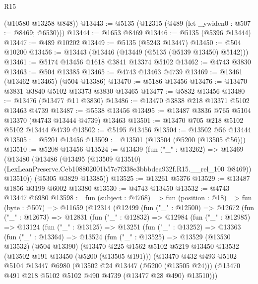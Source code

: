 \begin{lexlean}{R15}
\begin{coremodule}
{{{{{{{{{{{      (@10580 @13258 @848))
@13443 := @5135 (@12315 (@489 (let _ywiden0 : @507 := @8469; @6530)))
@13444 := @1653 @8469
@13446 := @5135 (@5396 @13444)
@13447 := @489 @10202
@13449 := @5135 (@5243 @13447)
@13450 := @504 @10200
@13456 := @13443 (@13446 (@13449 (@5135 (@5139 @13450) @5142)))
@13461 := @5174 @13456 @1618 @3841 @13374 @5102
@13462 := @4743 @3830
@13463 := @504 @13385
@13465 := @4743 @13463 @4739
@13469 := @13461 (@13462 @13465) (@504 @13386)
@13470 := @5186 @13456
@13476 := @13470 @3831 @3840 @5102 @13373 @3830 @13465
@13477 := @5832 @13456
@13480 := @13476 (@13477 @11 @3830)
@13486 := @13470 @3838 @218 @13371 @5102 @13463 @4739
@13487 := @5538 @13456
@13495 := @13487 @3836 @765 @5104 @13370 (@4743 @13444 @4739) @13463
@13501 := @13470 @705 @218 @5102 @5102 @13444 @4739
@13502 := @5195 @13456
@13504 := @13502 @56 @13444
@13505 := @5201 @13456
@13509 := @13501 (@13504 (@5200 (@13505 @56)))
@13510 := @5208 @13456
@13524 := @13439
    (fun ("_" : @13262) =>
    @13469
      (@13480
        (@13486
          (@13495
            (@13509 @13510)
            (LexLeanPreserve.Ceb108802001b57e7f338e3bbbdea932f.R15.__rel_100 @8469))
          @13510))
      (@5305 @3829 @13385))
@13525 := @13261 @5376
@13529 := @13487 @1856 @3199 @6002 @13380
@13530 := @4743 @13450
@13532 := @4743 @13447 @6980
@13598 := fun (subject : @4768) =>
  fun (position : @18) =>
  fun (byte : @507) =>
  @11659
    (@12314
      (@12499
        (fun ("_" : @12500) =>
        @12672
          (fun ("_" : @12673) =>
          @12831
            (fun ("_" : @12832) =>
            @12984
              (fun ("_" : @12985) =>
              @13124
                (fun ("_" : @13125) =>
                @13251
                  (fun ("_" : @13252) =>
                  @13363
                    (fun ("_" : @13364) =>
                    @13524
                      (fun ("_" : @13525) =>
                      @13529
                        (@13530 @13532)
                        (@504 @13390)
                        (@13470
                          @225
                          @1562
                          @5102
                          @5219
                          @13450
                          @13532
                          (@13502 @191 @13450 (@5200 (@13505 @191)))
                          (@13470
                            @432
                            @493
                            @5102
                            @5104
                            @13447
                            @6980
                            (@13502 @24 @13447 (@5200 (@13505 @24)))
                            (@13470 @491 @218 @5102 @5102 @490 @4739 (@13477 @28 @490) @13510)))
}}}}}}}}}}}
\end{coremodule}
\end{lexlean}
